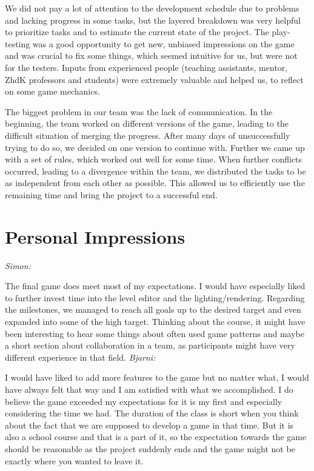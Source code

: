 We did not pay a lot of attention to the development schedule due to problems and lacking progress in some tasks, but the layered breakdown was very helpful to prioritize tasks and to estimate the current state of the project.
The play-testing was a good opportunity to get new, unbiased impressions on the game and was crucial to fix some things, which seemed intuitive for us, but were not for the testers. Inputs from experienced people (teaching assistants, mentor, ZhdK professors and students) were extremely valuable and helped us, to reflect on some game mechanics.

The biggest problem in our team was the lack of communication. In the beginning, the team worked on different versions of the game, leading to the difficult situation of merging the progress. After many days of unsuccessfully trying to do so, we decided on one version to continue with. Further we came up with a set of rules, which worked out well for some time. When further conflicts occurred, leading to a divergence within the team, we distributed the tasks to be as independent from each other as possible. This allowed us to efficiently use the remaining time and bring the project to a successful end.

\section{Personal Impressions}
\textit{Simon:}

The final game does meet most of my expectations. I would have especially liked to further invest time into the level editor and the lighting/rendering. Regarding the milestones, we managed to reach all goals up to the desired target and even expanded into some of the high target. Thinking about the course, it might have been interesting to hear some things about often used game patterns and maybe a short section about collaboration in a team, as participants might have very different experience in that field.
\newline\newline
\textit{Bjarni:}

I would have liked to add more features to the game but no matter what, I would have always felt that way and I am satisfied with what we accomplished. I do believe the game exceeded my expectations for it is my first and especially considering the time we had. The duration of the class is short when you think about the fact that we are supposed to develop a game in that time. But it is also a school course and that is a part of it, so the expectation towards the game should be reasonable as the project suddenly ends and the game might not be exactly where you wanted to leave it.

